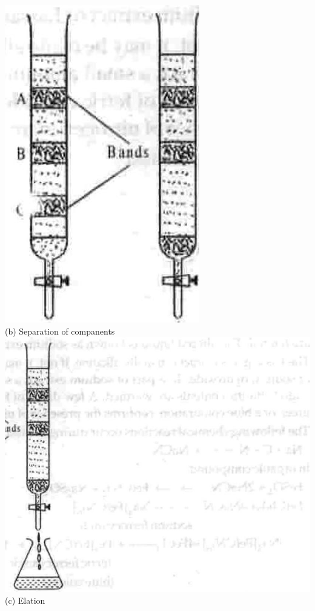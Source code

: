 \documentclass[10pt]{article}
\begin{document}
\includegraphics[max width=\textwidth, center]{2025_01_28_8470952b98110cec3aabg-105}\\
(b) Separation of companents\\
\includegraphics[max width=\textwidth, center]{2025_01_28_8470952b98110cec3aabg-105(2)}\\
(c) Elation
\end{document}
